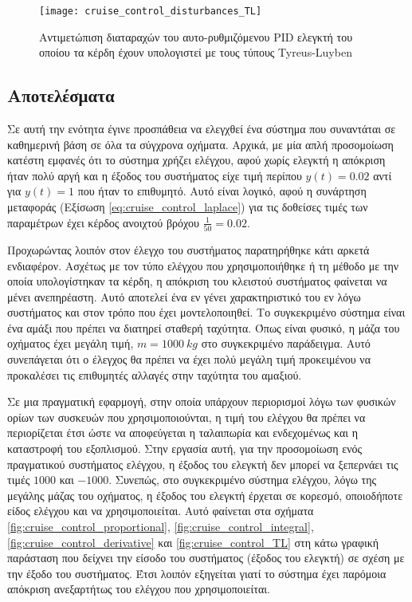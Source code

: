 \begin{figure}[h]
  \centering
  \texttt{[image: cruise\_control\_disturbances\_TL]}
  \caption{Αντιμετώπιση διαταραχών του αυτο-ρυθμιζόμενου PID ελεγκτή του οποίου τα κέρδη έχουν υπολογιστεί με τους τύπους Tyreus-Luyben}
  \label{fig:cruise_control_disturbances_TL}
\end{figure}

\subsection{Αποτελέσματα}

Σε αυτή την ενότητα έγινε προσπάθεια να ελεγχθεί ένα σύστημα που συναντάται σε καθημερινή βάση σε όλα τα σύγχρονα οχήματα. Αρχικά, με μία απλή προσομοίωση κατέστη εμφανές ότι το σύστημα χρήζει ελέγχου, αφού χωρίς ελεγκτή η απόκριση ήταν πολύ αργή και η έξοδος του συστήματος είχε τιμή περίπου $y(t) = 0.02$ αντί για $y(t) = 1$ που ήταν το επιθυμητό. Αυτό είναι λογικό, αφού η συνάρτηση μεταφοράς (Εξίσωση \ref{eq:cruise_control_laplace}) για τις δοθείσες τιμές των παραμέτρων έχει κέρδος ανοιχτού βρόχου $\displaystyle \frac{1}{50} = 0.02$.

Προχωρώντας λοιπόν στον έλεγχο του συστήματος παρατηρήθηκε κάτι αρκετά ενδιαφέρον. Ασχέτως με τον τύπο ελέγχου που χρησιμοποιήθηκε ή τη μέθοδο με την οποία υπολογίστηκαν τα κέρδη, η απόκριση του κλειστού συστήματος φαίνεται να μένει ανεπηρέαστη. Αυτό αποτελεί ένα εν γένει χαρακτηριστικό του εν λόγω συστήματος και στον τρόπο που έχει μοντελοποιηθεί. Το συγκεκριμένο σύστημα είναι ένα αμάξι που πρέπει να διατηρεί σταθερή ταχύτητα. Όπως είναι φυσικό, η μάζα του οχήματος έχει μεγάλη τιμή, $m = 1000\ kg$ στο συγκεκριμένο παράδειγμα. Αυτό συνεπάγεται ότι ο έλεγχος θα πρέπει να έχει πολύ μεγάλη τιμή προκειμένου να προκαλέσει τις επιθυμητές αλλαγές στην ταχύτητα του αμαξιού.

Σε μια πραγματική εφαρμογή, στην οποία υπάρχουν περιορισμοί λόγω των φυσικών ορίων των συσκευών που χρησιμοποιούνται, η τιμή του ελέγχου θα πρέπει να περιορίζεται έτσι ώστε να αποφεύγεται η ταλαιπωρία και ενδεχομένως και η καταστροφή του εξοπλισμού. Στην εργασία αυτή, για την προσομοίωση ενός πραγματικού συστήματος ελέγχου, η έξοδος του ελεγκτή δεν μπορεί να ξεπερνάει τις τιμές $1000$ και $-1000$. Συνεπώς, στο συγκεκριμένο σύστημα ελέγχου, λόγω της μεγάλης μάζας του οχήματος, η έξοδος του ελεγκτή έρχεται σε κορεσμό, οποιοδήποτε είδος ελέγχου και να χρησιμοποιείται. Αυτό φαίνεται στα σχήματα \ref{fig:cruise_control_proportional}, \ref{fig:cruise_control_integral}, \ref{fig:cruise_control_derivative} και \ref{fig:cruise_control_TL} στη κάτω γραφική παράσταση που δείχνει την είσοδο του συστήματος (έξοδος του ελεγκτή) σε σχέση με την έξοδο του συστήματος. Έτσι λοιπόν εξηγείται γιατί το σύστημα έχει παρόμοια απόκριση ανεξαρτήτως του ελέγχου που χρησιμοποιείται. 

